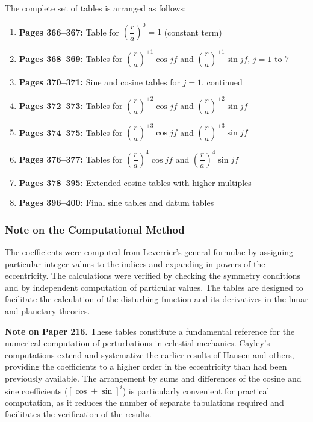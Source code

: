 \documentclass[11pt,a4paper]{book}
\begin{document}
The complete set of tables is arranged as follows:

\begin{enumerate}[leftmargin=2em]
  \item \textbf{Pages 366--367:} Table for $\left(\dfrac{r}{a}\right)^{0} = 1$ (constant term)
  \item \textbf{Pages 368--369:} Tables for $\left(\dfrac{r}{a}\right)^{\pm 1}\cos jf$ and $\left(\dfrac{r}{a}\right)^{\pm 1}\sin jf$, $j=1$ to $7$
  \item \textbf{Pages 370--371:} Sine and cosine tables for $j=1$, continued
  \item \textbf{Pages 372--373:} Tables for $\left(\dfrac{r}{a}\right)^{\pm 2}\cos jf$ and $\left(\dfrac{r}{a}\right)^{\pm 2}\sin jf$
  \item \textbf{Pages 374--375:} Tables for $\left(\dfrac{r}{a}\right)^{\pm 3}\cos jf$ and $\left(\dfrac{r}{a}\right)^{\pm 3}\sin jf$
  \item \textbf{Pages 376--377:} Tables for $\left(\dfrac{r}{a}\right)^{4}\cos jf$ and $\left(\dfrac{r}{a}\right)^{4}\sin jf$
  \item \textbf{Pages 378--395:} Extended cosine tables with higher multiples
  \item \textbf{Pages 396--400:} Final sine tables and datum tables
\end{enumerate}

\vspace{1em}

\subsubsection*{Note on the Computational Method}

The coefficients were computed from Leverrier's general formulae by assigning particular integer values to the indices and expanding in powers of the eccentricity. The calculations were verified by checking the symmetry conditions and by independent computation of particular values. The tables are designed to facilitate the calculation of the disturbing function and its derivatives in the lunar and planetary theories.

\vspace{1em}

\noindent\textbf{Note on Paper 216.} These tables constitute a fundamental reference for the numerical computation of perturbations in celestial mechanics. Cayley's computations extend and systematize the earlier results of Hansen and others, providing the coefficients to a higher order in the eccentricity than had been previously available. The arrangement by sums and differences of the cosine and sine coefficients ($[\cos+\sin]^{i}$) is particularly convenient for practical computation, as it reduces the number of separate tabulations required and facilitates the verification of the results.
\end{document}

